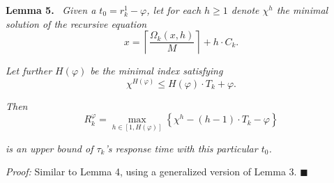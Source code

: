 \textbf{Lemma 5.} \ \textit{Given a $t_0 = r_k^1 - \varphi$, let for each $h \geq 1$ denote $\chi^h$ the minimal solution of the recursive equation}
\[
x=\left\lceil \frac{\Omega_k(x,h)}{M} \right\rceil + h \cdot C_k.
\tag{16}
\]

\textit{Let further $H(\varphi)$ be the minimal index satisfying}
\[
\chi^{H(\varphi)} \leq H(\varphi)\cdot T_k + \varphi.
\tag{17}
\]

\textit{Then}
\[
R_k^\varphi=\max_{h\in[1,H(\varphi)]}\left\{\chi^h-(h-1)\cdot T_k-\varphi\right\}
\tag{18}
\]

\textit{is an upper bound of $\tau_k$'s response time with this particular $t_0$.}

\bigskip

\noindent
\textit{Proof:} Similar to Lemma 4, using a generalized version of Lemma 3. \hfill $\blacksquare$
